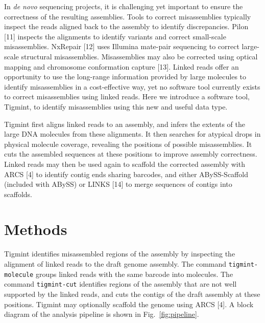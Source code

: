 \documentclass{bmcart}
\begin{document}
In \emph{de novo} sequencing projects, it is challenging yet important to ensure the correctness of the resulting assemblies. Tools to correct misassemblies typically inspect the reads aligned back to the assembly to identify discrepancies. Pilon {[}11{]} inspects the alignments to identify variants and correct small-scale misassemblies. NxRepair {[}12{]} uses Illumina mate-pair sequencing to correct large-scale structural misassemblies. Misassemblies may also be corrected using optical mapping and chromosome conformation capture {[}13{]}. Linked reads offer an opportunity to use the long-range information provided by large molecules to identify misassemblies in a cost-effective way, yet no software tool currently exists to correct misassemblies using linked reads. Here we introduce a software tool, Tigmint, to identify misassemblies using this new and useful data type.

Tigmint first aligns linked reads to an assembly, and infers the extents of the large DNA molecules from these alignments. It then searches for atypical drops in physical molecule coverage, revealing the positions of possible misassemblies. It cuts the assembled sequences at these positions to improve assembly correctness. Linked reads may then be used again to scaffold the corrected assembly with ARCS {[}4{]} to identify contig ends sharing barcodes, and either ABySS-Scaffold (included with ABySS) or LINKS {[}14{]} to merge sequences of contigs into scaffolds.

\hypertarget{methods}{%
\section*{Methods}\label{methods}}

Tigmint identifies misassembled regions of the assembly by inspecting the alignment of linked reads to the draft genome assembly. The command \texttt{tigmint-molecule} groups linked reads with the same barcode into molecules. The command \texttt{tigmint-cut} identifies regions of the assembly that are not well supported by the linked reads, and cuts the contigs of the draft assembly at these positions. Tigmint may optionally scaffold the genome using ARCS {[}4{]}. A block diagram of the analysis pipeline is shown in Fig.~\ref{fig:pipeline}.
\end{document}
